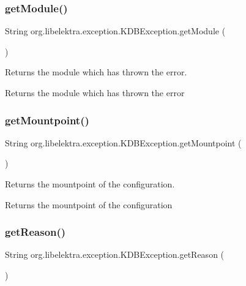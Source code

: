 \subsubsection{\texorpdfstring{getModule()}{getModule()}}
{\footnotesize\ttfamily String org.\+libelektra.\+exception.\+K\+D\+B\+Exception.\+get\+Module (\begin{DoxyParamCaption}{ }\end{DoxyParamCaption})\hspace{0.3cm}{\ttfamily [inline]}}



Returns the module which has thrown the error. 

\begin{DoxyReturn}{Returns}
the module which has thrown the error 
\end{DoxyReturn}
\mbox{\label{classorg_1_1libelektra_1_1exception_1_1KDBException_a7595349ac675e5b57616020d512b82d2}} 
\subsubsection{\texorpdfstring{getMountpoint()}{getMountpoint()}}
{\footnotesize\ttfamily String org.\+libelektra.\+exception.\+K\+D\+B\+Exception.\+get\+Mountpoint (\begin{DoxyParamCaption}{ }\end{DoxyParamCaption})\hspace{0.3cm}{\ttfamily [inline]}}



Returns the mountpoint of the configuration. 

\begin{DoxyReturn}{Returns}
the mountpoint of the configuration 
\end{DoxyReturn}
\mbox{\label{classorg_1_1libelektra_1_1exception_1_1KDBException_ab3883ac714dca52759f08aaee708cab0}} 
\subsubsection{\texorpdfstring{getReason()}{getReason()}}
{\footnotesize\ttfamily String org.\+libelektra.\+exception.\+K\+D\+B\+Exception.\+get\+Reason (\begin{DoxyParamCaption}{ }\end{DoxyParamCaption})\hspace{0.3cm}{\ttfamily [inline]}}



